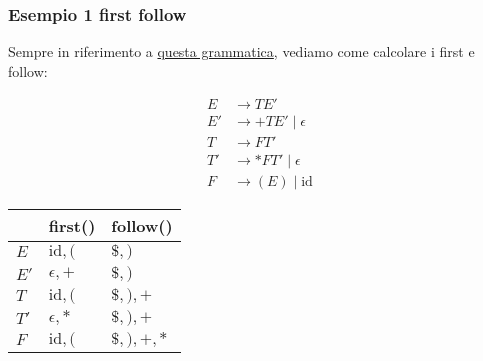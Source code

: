 \subsubsection{Esempio 1 first follow}
Sempre in riferimento a \hyperref[grammatica esempio]{questa grammatica}, vediamo come calcolare i first e follow:

\begin{minipage}[t]{0.48\textwidth}
	\begin{align*}
		E  & \rightarrow  TE'                \\
		E' & \rightarrow  +TE' \mid \epsilon \\
		T  & \rightarrow  FT'                \\
		T' & \rightarrow  *FT' \mid \epsilon \\
		F  & \rightarrow  (E) \mid \text{id}
	\end{align*}
\end{minipage}
%
\begin{minipage}[t]{0.48\textwidth}
	\begin{table}[H]
		\centering
		\begin{tabular}{l|ll}
			\toprule
			       & first()        & follow()      \\
			\midrule
			$ E $  & $\text{id}, ($ & $\$, )$       \\
			$ E' $ & $\epsilon, +$  & $\$, )$       \\
			$T $   & $\text{id}, ($ & $\$, ), +$    \\
			$T'$   & $\epsilon, *$  & $\$, ), +$    \\
			$F $   & $\text{id}, ($ & $\$, ), +, *$ \\
			\bottomrule
		\end{tabular}
	\end{table}
\end{minipage}

